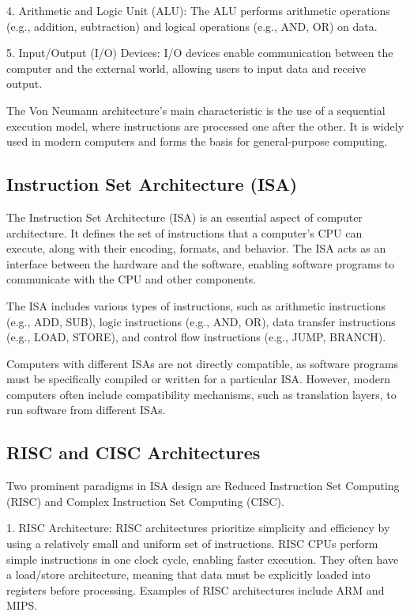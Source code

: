 \documentclass{article}
\begin{document}
4. Arithmetic and Logic Unit (ALU): The ALU performs arithmetic operations (e.g., addition, subtraction) and logical operations (e.g., AND, OR) on data.

5. Input/Output (I/O) Devices: I/O devices enable communication between the computer and the external world, allowing users to input data and receive output.

The Von Neumann architecture's main characteristic is the use of a sequential execution model, where instructions are processed one after the other. It is widely used in modern computers and forms the basis for general-purpose computing.

\subsection{Instruction Set Architecture (ISA)}

The Instruction Set Architecture (ISA) is an essential aspect of computer architecture. It defines the set of instructions that a computer's CPU can execute, along with their encoding, formats, and behavior. The ISA acts as an interface between the hardware and the software, enabling software programs to communicate with the CPU and other components.

The ISA includes various types of instructions, such as arithmetic instructions (e.g., ADD, SUB), logic instructions (e.g., AND, OR), data transfer instructions (e.g., LOAD, STORE), and control flow instructions (e.g., JUMP, BRANCH).

Computers with different ISAs are not directly compatible, as software programs must be specifically compiled or written for a particular ISA. However, modern computers often include compatibility mechanisms, such as translation layers, to run software from different ISAs.

\subsection{RISC and CISC Architectures}

Two prominent paradigms in ISA design are Reduced Instruction Set Computing (RISC) and Complex Instruction Set Computing (CISC).

1. RISC Architecture: RISC architectures prioritize simplicity and efficiency by using a relatively small and uniform set of instructions. RISC CPUs perform simple instructions in one clock cycle, enabling faster execution. They often have a load/store architecture, meaning that data must be explicitly loaded into registers before processing. Examples of RISC architectures include ARM and MIPS.
\end{document}

